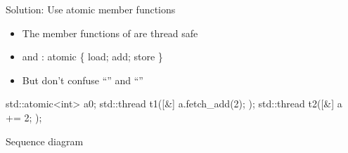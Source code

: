 \begin{frame}[fragile]
  \begin{block}{Solution: Use atomic member functions}
    \begin{itemize}
      \item The member functions of  are thread safe
      \item {} and : atomic \{ load; add; store \}
      \item But don't confuse ``'' and ``''
    \end{itemize}
  \end{block}
  \begin{exampleblock}{}
    \begin{cppcode*}{}
      std::atomic<int> a{0};
      std::thread t1([&]{ a.fetch_add(2); });
      std::thread t2([&]{ a += 2; });
    \end{cppcode*}
  \end{exampleblock}
  \begin{block}{Sequence diagram}
  \end{block}
\end{frame}

